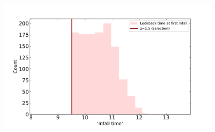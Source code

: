 \documentclass[twocolumn]{aastex631}
\begin{document}
\begin{figure}[htb]
    \centering
    \includegraphics[width=\columnwidth]{plots/5_define-beginning/countvsinfalltime.pdf}
    \caption{}
\end{figure}









{}

\end{document}
